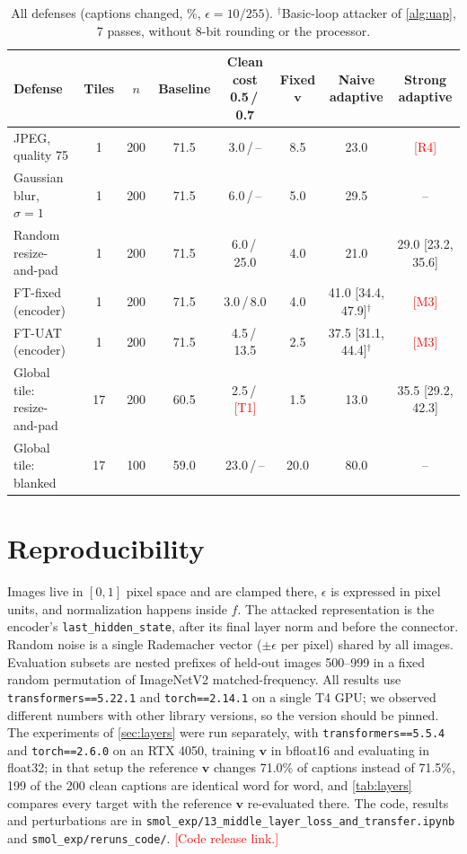 \documentclass[10pt,twocolumn,letterpaper]{article}
\newcommand{\pend}[1]{\textcolor{red}{[#1]}}
\newcommand{\vv}{\boldsymbol{v}}
\begin{document}
\begin{table}[h]
\centering
\small
\begin{tabular}{@{}lccccccc@{}}
\toprule
Defense & Tiles & $n$ & Baseline & Clean cost 0.5\,/\,0.7 & Fixed $\vv$ & Naive adaptive & Strong adaptive \\
\midrule
JPEG, quality 75            & 1  & 200 & 71.5 & 3.0\,/\,--   & 8.5 & 23.0 & \pend{R4} \\
Gaussian blur, $\sigma=1$   & 1  & 200 & 71.5 & 6.0\,/\,--   & 5.0 & 29.5 & -- \\
Random resize-and-pad       & 1  & 200 & 71.5 & 6.0\,/\,25.0 & 4.0 & 21.0 & 29.0 [23.2, 35.6] \\
FT-fixed (encoder)          & 1  & 200 & 71.5 & 3.0\,/\,8.0  & 4.0 & 41.0 [34.4, 47.9]$^\dagger$ & \pend{M3} \\
FT-UAT (encoder)            & 1  & 200 & 71.5 & 4.5\,/\,13.5 & 2.5 & 37.5 [31.1, 44.4]$^\dagger$ & \pend{M3} \\
Global tile: resize-and-pad & 17 & 200 & 60.5 & 2.5\,/\,\pend{T1} & 1.5 & 13.0 & 35.5 [29.2, 42.3] \\
Global tile: blanked        & 17 & 100 & 59.0 & 23.0\,/\,--  & 20.0 & 80.0 & -- \\
\bottomrule
\end{tabular}
\caption{All defenses (captions changed, \%, $\epsilon=10/255$). $^\dagger$Basic-loop attacker of \cref{alg:uap}, 7 passes, without 8-bit rounding or the processor.}
\label{tab:defense-all}
\end{table}

\section{Reproducibility}
\label{app:repro}

Images live in $[0,1]$ pixel space and are clamped there, $\epsilon$ is expressed in pixel units, and normalization happens inside $f$. The attacked representation is the encoder's \texttt{last\_hidden\_state}, after its final layer norm and before the connector. Random noise is a single Rademacher vector ($\pm\epsilon$ per pixel) shared by all images. Evaluation subsets are nested prefixes of held-out images 500--999 in a fixed random permutation of ImageNetV2 matched-frequency. All results use \texttt{transformers==5.22.1} and \texttt{torch==2.14.1} on a single T4 GPU; we observed different numbers with other library versions, so the version should be pinned. The experiments of \cref{sec:layers} were run separately, with \texttt{transformers==5.5.4} and \texttt{torch==2.6.0} on an RTX 4050, training $\vv$ in bfloat16 and evaluating in float32; in that setup the reference $\vv$ changes 71.0\% of captions instead of 71.5\%, 199 of the 200 clean captions are identical word for word, and \cref{tab:layers} compares every target with the reference $\vv$ re-evaluated there. The code, results and perturbations are in \texttt{smol\_exp/13\_middle\_layer\_loss\_and\_transfer.ipynb} and \texttt{smol\_exp/reruns\_code/}. \pend{Code release link.}
\end{document}

